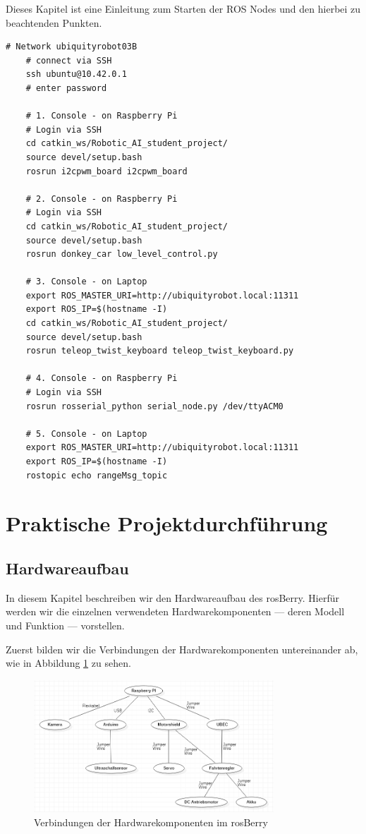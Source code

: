 \documentclass[conference]{IEEEtran}
\begin{document}
Dieses Kapitel ist eine Einleitung zum Starten der ROS Nodes und den hierbei zu beachtenden Punkten.

\begin{lstlisting}[label={list:first},caption=Sample rosBash code.]
	# Network ubiquityrobot03B
	# connect via SSH
	ssh ubuntu@10.42.0.1
	# enter password

	# 1. Console - on Raspberry Pi
	# Login via SSH
	cd catkin_ws/Robotic_AI_student_project/
	source devel/setup.bash
	rosrun i2cpwm_board i2cpwm_board

	# 2. Console - on Raspberry Pi
	# Login via SSH
	cd catkin_ws/Robotic_AI_student_project/
	source devel/setup.bash
	rosrun donkey_car low_level_control.py

	# 3. Console - on Laptop 
	export ROS_MASTER_URI=http://ubiquityrobot.local:11311
	export ROS_IP=$(hostname -I)
	cd catkin_ws/Robotic_AI_student_project/
	source devel/setup.bash
	rosrun teleop_twist_keyboard teleop_twist_keyboard.py

	# 4. Console - on Raspberry Pi
	# Login via SSH
	rosrun rosserial_python serial_node.py /dev/ttyACM0

	# 5. Console - on Laptop
	export ROS_MASTER_URI=http://ubiquityrobot.local:11311
	export ROS_IP=$(hostname -I)
	rostopic echo rangeMsg_topic
\end{lstlisting}

\section{Praktische Projektdurchführung}


\subsection{Hardwareaufbau}%
In diesem Kapitel beschreiben wir den Hardwareaufbau des rosBerry.
Hierfür werden wir die einzelnen verwendeten Hardwarekomponenten — deren Modell und Funktion — vorstellen.

Zuerst bilden wir die Verbindungen der Hardwarekomponenten untereinander ab, wie in Abbildung \ref{Hardwarekomponenten} zu sehen.

\begin{figure}[!ht]
	\centering
	\includegraphics[width=9cm]{img/Hardwarekomponenten.PNG}
	\caption{Verbindungen der Hardwarekomponenten im rosBerry}
	\label{Hardwarekomponenten}
\end{figure}
\end{document}
